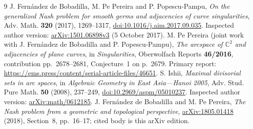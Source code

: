 \documentclass[11pt]{article}
\newcommand{\C}{\mathbb C}
\begin{document}
\begin{thebibliography}{9}\small
{}
J. Fern\'andez de Bobadilla, M. Pe Pereira and P. Popescu-Pampu,
\emph{On the generalized Nash problem for smooth germs and adjacencies
of curve singularities}, Adv. Math. \textbf{320} (2017), 1269--1317,
\href{https://doi.org/10.1016/j.aim.2017.09.035}{doi:10.1016/j.aim.2017.09.035}.
Inspected author version: \href{https://arxiv.org/abs/1501.06898v3}
{arXiv:1501.06898v3} (5 October 2017).
M. Pe Pereira (joint work with J. Fern\'andez de Bobadilla and
P. Popescu-Pampu), \emph{The arcspace of \(\C^2\) and adjacencies of
plane curves}, in \emph{Singularities}, Oberwolfach Reports
\textbf{46/2016}, contribution pp.~2678--2681, Conjecture~1 on p.~2679.
Primary report:
\url{https://ems.press/content/serial-article-files/46651}.
S. Ishii, \emph{Maximal divisorial sets in arc spaces}, in
\emph{Algebraic Geometry in East Asia---Hanoi 2005}, Adv. Stud. Pure
Math. \textbf{50} (2008), 237--249,
\href{https://doi.org/10.2969/aspm/05010237}{doi:10.2969/aspm/05010237}.
Inspected author version: \href{https://arxiv.org/abs/math/0612185}
{arXiv:math/0612185}.
J. Fern\'andez de Bobadilla and M. Pe Pereira,
\emph{The Nash problem from a geometric and topological perspective},
\href{https://arxiv.org/abs/1805.01418}{arXiv:1805.01418} (2018),
Section~8, pp.~16--17; cited body is this arXiv edition.
\end{thebibliography}
\end{document}
